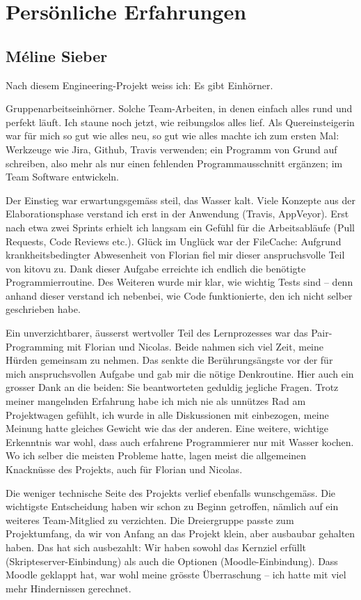 \documentclass[a4paper]{article}
\let\oldsection\section
\renewcommand\section{\clearpage\oldsection}
\begin{document}
  \section{Persönliche Erfahrungen}

  \subsection{Méline Sieber}

Nach diesem Engineering-Projekt weiss ich: Es gibt Einhörner. 

Gruppenarbeitseinhörner. Solche Team-Arbeiten, in denen einfach alles rund und perfekt läuft. Ich staune noch jetzt, wie reibungslos alles lief. Als Quereinsteigerin war für mich so gut wie alles neu, so gut wie alles machte ich zum ersten Mal: Werkzeuge wie Jira, Github, Travis verwenden; ein Programm von Grund auf schreiben, also mehr als nur einen fehlenden Programmausschnitt ergänzen; im Team Software entwickeln.

Der Einstieg war erwartungsgemäss steil, das Wasser kalt. Viele Konzepte aus der Elaborationsphase verstand ich erst in der Anwendung (Travis, AppVeyor). Erst nach etwa zwei Sprints erhielt ich langsam ein Gefühl für die Arbeitsabläufe (Pull Requests, Code Reviews etc.). Glück im Unglück war der FileCache: Aufgrund krankheitsbedingter Abwesenheit von Florian fiel mir dieser anspruchsvolle Teil von kitovu zu. Dank dieser Aufgabe erreichte ich endlich die benötigte Programmierroutine. Des Weiteren wurde mir klar, wie wichtig Tests sind -- denn anhand dieser verstand ich nebenbei, wie Code funktionierte, den ich nicht selber geschrieben habe.

Ein unverzichtbarer, äusserst wertvoller Teil des Lernprozesses war das Pair-Programming mit Florian und Nicolas. Beide nahmen sich viel Zeit, meine Hürden gemeinsam zu nehmen. Das senkte die Berührungsängste vor der für mich anspruchsvollen Aufgabe und gab mir die nötige Denkroutine. Hier auch ein grosser Dank an die beiden: Sie beantworteten geduldig jegliche Fragen. Trotz meiner mangelnden Erfahrung habe ich mich nie als unnützes Rad am Projektwagen gefühlt, ich wurde in alle Diskussionen mit einbezogen, meine Meinung hatte gleiches Gewicht wie das der anderen. Eine weitere, wichtige Erkenntnis war wohl, dass auch erfahrene Programmierer nur mit Wasser kochen. Wo ich selber die meisten Probleme hatte, lagen meist die allgemeinen Knacknüsse des Projekts, auch für Florian und Nicolas.

Die weniger technische Seite des Projekts verlief ebenfalls wunschgemäss. Die wichtigste Entscheidung haben wir schon zu Beginn getroffen, nämlich auf ein weiteres Team-Mitglied zu verzichten. Die Dreiergruppe passte zum Projektumfang, da wir von Anfang an das Projekt klein, aber ausbaubar gehalten haben. Das hat sich ausbezahlt: Wir haben sowohl das Kernziel erfüllt (Skripteserver-Einbindung) als auch die Optionen (Moodle-Einbindung). Dass Moodle geklappt hat, war wohl meine grösste Überraschung -- ich hatte mit viel mehr Hindernissen gerechnet.
\end{document}
